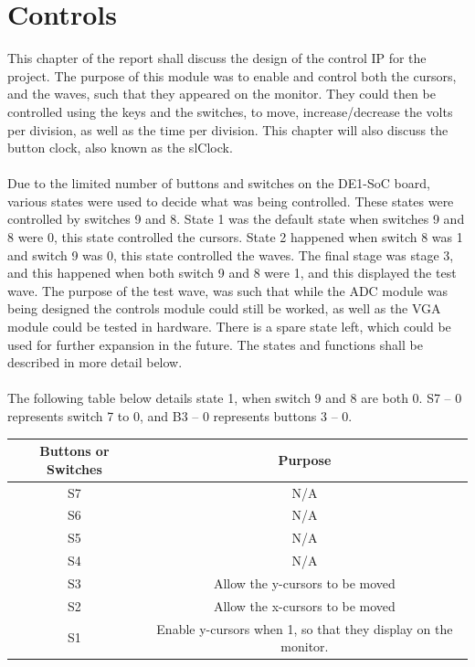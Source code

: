 \documentclass[a4paper,12pt]{article}
\begin{document}
\section{Controls}
\begin{flushleft}
This chapter of the report shall discuss the design of the control IP for the project. The purpose of this module was to enable and control both the cursors, and the waves, such that they appeared on the monitor. They could then be controlled using the keys and the switches, to move, increase/decrease the volts per division, as well as the time per division. This chapter will also discuss the button clock, also known as the slClock. \\ \- \\
Due to the limited number of buttons and switches on the DE1-SoC board, various states were used to decide what was being controlled. These states were controlled by switches 9 and 8. State 1 was the default state when switches 9 and 8 were 0, this state controlled the cursors. State 2 happened when switch 8 was 1 and switch 9 was 0, this state controlled the waves. The final stage was stage 3, and this happened when both switch 9 and 8 were 1, and this displayed the test wave. The purpose of the test wave, was such that while the ADC module was being designed the controls module could still be worked, as well as the VGA module could be tested in hardware. There is a spare state left, which could be used for further expansion in the future. The states and functions shall be described in more detail below. \\ \- \\
The following table below details state 1, when switch 9 and 8 are both 0.  S7 – 0 represents switch 7 to 0, and B3 – 0 represents buttons 3 – 0.\\
\begin{center}
\begin{table}[H]
	\centering
	\begin{tabular}{|c|c|}
	\hline 
	\textbf{Buttons or Switches} & \textbf{Purpose} \\ 
	\hline 
	S7 & N/A \\ 
	\hline 
	S6 & N/A \\ 
	\hline 
	S5 & N/A \\ 
	\hline 
	S4 & N/A \\ 
	\hline 
	S3 & Allow the y-cursors to be moved \\ 
	\hline 
	S2 & Allow the x-cursors to be moved \\ 
	\hline 
	S1 & Enable y-cursors when 1, so that they display on the monitor.

\end{tabular}
\end{table}
\end{center}
\end{flushleft}
\end{document}
